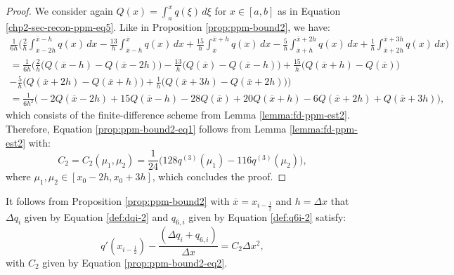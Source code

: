 \begin{proof}
	We consider again $Q(x) = \int_{a}^{x} q(\xi) \,d\xi$ for $x \in [a,b]$ as in 
	Equation \eqref{chp2-sec-recon-ppm-eq5}. 
	Like in Proposition \ref{prop:ppm-bound2}, we have:
	\begin{align*}
	\frac{1}{6h}
	\bigg( \frac{2}{h} \int_{\overline{x}-2h}^{\overline{x}-h} q(x) \,dx 
		      -\frac{13}{h}\int_{\overline{x}-h}^{\overline{x}} q(x) \,dx   
		      +\frac{15}{h}\int_{\overline{x}}^{\overline{x}+h} q(x) \,dx 
		      -\frac{5}{h} \int_{\overline{x}+h}^{\overline{x}+2h} q(x) \,dx   
		      +\frac{1}{h} \int_{\overline{x}+2h}^{\overline{x}+3h} q(x) \,dx   
		\bigg)\\
		= \frac{1}{6h} \bigg(
		\frac{2}{h}   \big( Q(\overline{x}-h)- Q(\overline{x}-2h)\big) 
		-\frac{13}{h} \big( Q(\overline{x}) - Q(\overline{x}-h) \big) 
		+\frac{15}{h} \big( Q(\overline{x}+h) - Q(\overline{x})  \big) \\
		-\frac{5}{h}  \big( Q(\overline{x}+2h) - Q(\overline{x}+h)  \big) 
		+\frac{1}{h}  \big( Q(\overline{x}+3h) - Q(\overline{x}+2h)  \big) 
		\bigg)\\
		= \frac{1}{6h^2}\bigg(-2Q(\overline{x}-2h) + 15Q(\overline{x}-h) - 28Q(\overline{x}) 
		+20Q(\overline{x}+h) -6Q(\overline{x}+2h) + Q(\overline{x}+3h)  \bigg),
	\end{align*}
	which consists of the finite-difference scheme from Lemma \ref{lemma:fd-ppm-est2}. 
	Therefore, Equation \eqref{prop:ppm-bound2-eq1} follows from 
	Lemma \ref{lemma:fd-ppm-est2} with:
	\begin{equation}
		\label{prop:ppm-bound2-eq2}
		C_2 = C_2(\mu_1,\mu_2) = \frac{1}{24}\bigg(128q^{(3)}(\mu_{1}) - 116q^{(3)}(\mu_{2})\bigg), 
	\end{equation}
	where $\mu_{1}, \mu_{2} \in [x_0-2h,x_0+3h]$, which concludes the proof.

\end{proof}

\begin{corollary}
	\label{prop:ppm-bound2-corollary}
	It follows from Proposition \ref{prop:ppm-bound2} with $\overline{x} = x_{i-\frac{1}{2}}$
	and $h = \Delta x$
	that $\Delta q_i$ given by Equation \eqref{def:dqi-2} 
	and $q_{6,i}$ given by Equation \eqref{def:q6i-2}
 satisfy:
	\begin{equation}
	q'(x_{i-\frac{1}{2}})-\frac{(\Delta q_i + q_{6, i})}{\Delta x}  = C_2\Delta x^2,
	\end{equation}
	with $C_2$ given by Equation \eqref{prop:ppm-bound2-eq2}.
\end{corollary}

